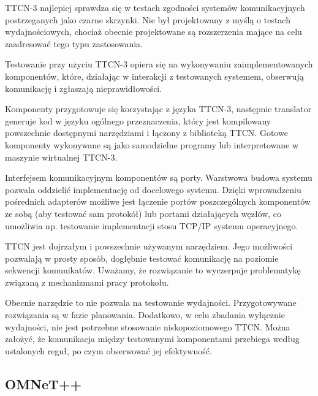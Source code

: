 \documentclass[00-praca-magisterska.tex]{subfiles}
\begin{document}
TTCN-3 najlepiej sprawdza się w testach zgodności systemów komunikacyjnych
postrzeganych jako czarne skrzynki. Nie był projektowany z myślą o testach
wydajnościowych, chociaż obecnie projektowane są rozszerzenia mające na celu
zaadresować tego typu zastosowania.


Testowanie przy użyciu TTCN-3 opiera się na wykonywaniu zaimplementowanych
komponentów, które, działając w interakcji z testowanych systemem, obserwują
komunikację i zgłaszają nieprawidłowości.

Komponenty przygotowuje się korzystając z języka TTCN-3, następnie translator
generuje kod w języku ogólnego przeznaczenia, który jest kompilowany powszechnie
dostępnymi narzędziami i łączony z biblioteką TTCN. Gotowe komponenty wykonywane
są jako samodzielne programy lub interpretowane w maszynie wirtualnej TTCN-3.

Interfejsem komunikacyjnym komponentów są porty. Warstwowa budowa systemu
pozwala oddzielić implementację od docelowego systemu. Dzięki wprowadzeniu
pośrednich adapterów możliwe jest łączenie portów poszczególnych komponentów ze
sobą (aby testować sam protokół) lub portami działających węzłów, co umożliwia
np. testowanie implementacji stosu TCP/IP systemu operacyjnego.


TTCN jest dojrzałym i powszechnie używanym narzędziem. Jego możliwości pozwalają
w prosty sposób, dogłębnie testować komunikację na poziomie sekwencji
komunikatów. Uważamy, że rozwiązanie to wyczerpuje problematykę związaną z
mechanizmami pracy protokołu.

Obecnie narzędzie to nie pozwala na testowanie wydajności. Przygotowywane
rozwiązania są w fazie planowania. Dodatkowo, w celu zbadania wyłącznie
wydajności, nie jest potrzebne stosowanie niskopoziomowego TTCN. Można założyć,
że komunikacja między testowanymi komponentami przebiega według ustalonych
reguł, po czym obserwować jej efektywność.

\subsection{OMNeT++}
\end{document}
